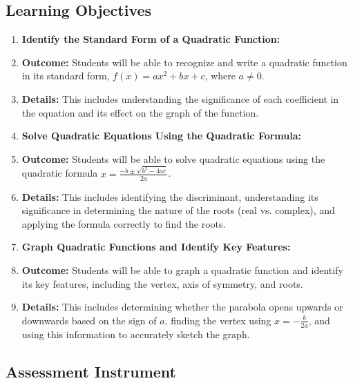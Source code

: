 \subsection{Learning Objectives}
\label{ssec:lear-fe6e}


\begin{enumerate}
    \item \textbf{Identify the Standard Form of a Quadratic Function:}
    \item \textbf{Outcome:} Students will be able to recognize and write a quadratic function in its standard form, $ f(x) = ax^2 + bx + c $, where $ a \neq 0 $.
    \item \textbf{Details:} This includes understanding the significance of each coefficient in the equation and its effect on the graph of the function.
    \item \textbf{Solve Quadratic Equations Using the Quadratic Formula:}
    \item \textbf{Outcome:} Students will be able to solve quadratic equations using the quadratic formula $ x = \frac{-b \pm \sqrt{b^2 - 4ac}}{2a} $.
    \item \textbf{Details:} This includes identifying the discriminant, understanding its significance in determining the nature of the roots (real vs. complex), and applying the formula correctly to find the roots.
    \item \textbf{Graph Quadratic Functions and Identify Key Features:}
    \item \textbf{Outcome:} Students will be able to graph a quadratic function and identify its key features, including the vertex, axis of symmetry, and roots.
    \item \textbf{Details:} This includes determining whether the parabola opens upwards or downwards based on the sign of $ a $, finding the vertex using $ x = -\frac{b}{2a} $, and using this information to accurately sketch the graph.
\end{enumerate}


\subsection{Assessment Instrument}
\label{ssec:asse-3669}


